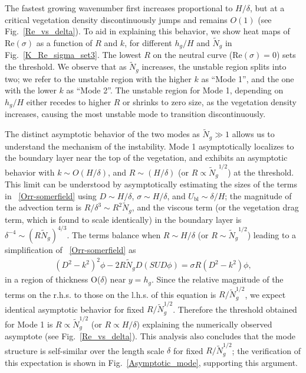 \documentclass[aps,preprint,12pt]{revtex4-1}  %
\newcommand{\hg}{h_g}
\newcommand{\Rey}{{R}}
\newcommand{\Ndg}{\tilde{N}_g}
\newcommand{\ubl}{U_\text{bl}}
\begin{document}
The fastest growing wavenumber first increases proportional to $H/\delta$, but at a critical vegetation density discontinuously jumps and remains $O(1)$ (see Fig.~\ref{Re_vs_delta}). 
To aid in explaining this behavior, we show heat maps of Re$(\sigma)$ as a function of $\Rey$ and $k$, for different $\hg/H$ and $\Ndg$ in Fig.~\ref{K_Re_sigma_set3}. 
The lowest $\Rey$ on the neutral curve (Re$(\sigma)=0$) sets the threshold. 
We observe that as $\Ndg$ increases, the unstable region splits into two; we refer to the unstable region with the higher $k$ as ``Mode 1'', and the one with the lower $k$ as ``Mode 2''. 
The unstable region for Mode 1, depending on $\hg/H$ either recedes to higher $\Rey$ or shrinks to zero size, as the vegetation density increases, causing the most unstable mode to transition discontinuously.

The distinct asymptotic behavior of the two modes as $\Ndg \gg 1$ allows us to understand the mechanism of the instability. 
Mode 1 asymptotically localizes to the boundary layer near the top of the vegetation, and exhibits an asymptotic behavior with $k \sim O(H/\delta)$, and $\Rey \sim (H/\delta)$ (or $\Rey \propto {\Ndg}^{1/2}$) at the threshold. 
This limit can be understood by asymptotically estimating the sizes of the terms in ~\eqref{Orr-somerfield} using $D\sim H/\delta$, $\sigma \sim H/\delta$, and $\ubl \sim \delta/H$; the magnitude of the advection term is $\Rey/\delta^3 \sim \Rey^2 \Ndg $, and the viscous term (or the vegetation drag term, which is found to scale identically) in the boundary layer is $\delta^{-4} \sim (\Rey \Ndg)^{4/3}$. 
The terms balance when $\Rey \sim H/\delta$ (or $\Rey \sim {\Ndg}^{1/2}$) leading to a simplification of ~\eqref{Orr-somerfield} as
\begin{align}
(D^2-k^2)^2 \phi- 2 \Rey \Ndg D( SUD\phi) = \sigma \Rey (D^2-k^2)\phi,
\label{eqn:mode1asymp}
\end{align} 
in a region of thickness O($\delta$) near $y=\hg$.
Since the relative magnitude of the terms on the r.h.s. to those on the l.h.s. of this equation is $\Rey/\Ndg^{1/2}$, we expect identical asymptotic behavior for fixed $\Rey/\Ndg^{1/2}$. 
Therefore the threshold obtained for Mode 1 is $\Rey \propto \Ndg^{1/2}$ (or $\Rey \propto H/\delta$) explaining the numerically observed asymptote (see Fig.~\ref{Re_vs_delta}). 
This analysis also concludes that the mode structure is self-similar over the length scale $\delta$ for fixed $\Rey/\Ndg^{1/2}$; the verification of this expectation is shown in Fig.~\ref{Asymptotic_mode}, supporting this argument.
\end{document}
